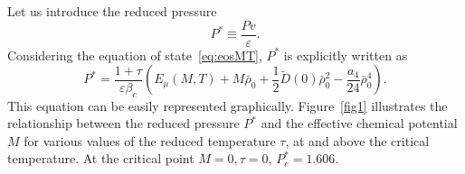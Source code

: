 \documentclass[12pt]{article}
\begin{document}
	Let us introduce the reduced pressure
	\begin{equation}
		\label{def:reduced_pres}
		P^* \equiv \frac{P v}{\varepsilon}.
	\end{equation}
	Considering the equation of state~\eqref{eq:eosMT}, $P^*$ is explicitly written as
	\begin{equation}
		\label{eq:eosPTM_reduced}
		P^* = \frac{1 + \tau}{\varepsilon \beta_c} \left( E_\mu(M, T) + M \bar \rho_0 + \frac{1}{2} \tilde D(0) \bar \rho_0^2 - \frac{a_4}{24} \bar \rho_0^4 \right).
	\end{equation}
	This equation can be easily represented graphically. Figure~\ref{fig1} illustrates the relationship between the reduced pressure $P^*$ and the effective chemical potential $M$ for various values of the reduced temperature $\tau$, at and above the critical temperature. At the critical point $M=0, \tau=0$, $P^*_c = 1.606$. 
	
	
\end{document}
